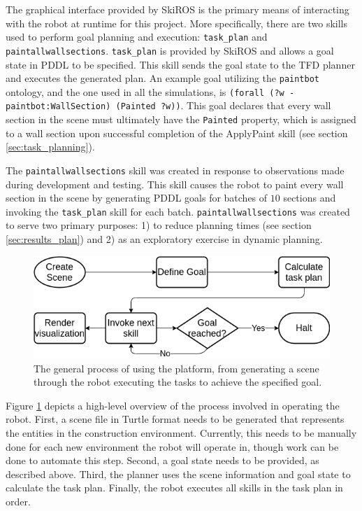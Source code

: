 The graphical interface provided by SkiROS is the primary means of interacting with the robot at runtime for this project. More specifically, there are two skills used to perform goal planning and execution: {\tt task\_plan} and {\tt paintallwallsections}. {\tt task\_plan} is provided by SkiROS and allows a goal state in PDDL to be specified. This skill sends the goal state to the TFD planner and executes the generated plan. An example goal utilizing the {\tt paintbot} ontology, and the one used in all the simulations, is {\tt (forall (?w - paintbot:WallSection) (Painted ?w))}. This goal declares that every wall section in the scene must ultimately have the {\tt Painted} property, which is assigned to a wall section upon successful completion of the ApplyPaint skill (see section \ref{sec:task_planning}).

The {\tt paintallwallsections} skill was created in response to observations made during development and testing. This skill causes the robot to paint every wall section in the scene by generating PDDL goals for batches of $10$ sections and invoking the {\tt task\_plan} skill for each batch. {\tt paintallwallsections} was created to serve two primary purposes: 1) to reduce planning times (see section \ref{sec:results_plan}) and 2) as an exploratory exercise in dynamic planning.

\begin{figure}
    \centering
    \includegraphics[width=1.0 \linewidth]{images/process_2.png}
    \caption{The general process of using the platform, from generating a scene through the robot executing the tasks to achieve the specified goal.}
    \label{fig:process}
\end{figure}

Figure \ref{fig:process} depicts a high-level overview of the process involved in operating the robot. First, a scene file in Turtle format needs to be generated that represents the entities in the construction environment. Currently, this needs to be manually done for each new environment the robot will operate in, though work can be done to automate this step. Second, a goal state needs to be provided, as described above. Third, the planner uses the scene information and goal state to calculate the task plan. Finally, the robot executes all skills in the task plan in order.

